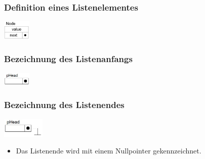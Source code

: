 \subsubsection{Definition eines Listenelementes}
\begin{flushleft}
  {\includegraphics[width=0.1\textwidth]{images/Listen/SLL.png}}
  \label{Fig: Single Linked List}
\end{flushleft}


\begin{multicols}{2}
\subsubsection{Bezeichnung des Listenanfangs}
\begin{flushleft}
  {\includegraphics[width=0.1\textwidth]{images/Listen/SLL_Anfang.jpg}}
  \label{Fig: Single Linked List}
\end{flushleft}


\subsubsection{Bezeichnung des Listenendes}
\begin{flushleft}
  {\includegraphics[width=0.15\textwidth]{images/Listen/SLL_Ende.jpg}}
  \label{Fig: Single Linked List}
\end{flushleft}
\begin{itemize}
  \item Das Listenende wird mit einem Nullpointer gekennzeichnet.
\end{itemize}
\end{multicols}

